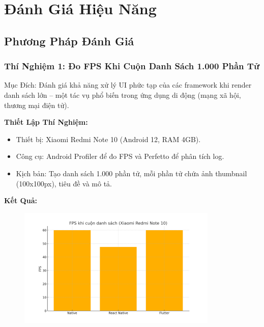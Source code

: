 \section{Đánh Giá Hiệu Năng}

\subsection{Phương Pháp Đánh Giá}
\renewcommand{\labelitemi}{--}    
\subsubsection{Thí Nghiệm 1: Đo FPS Khi Cuộn Danh Sách 1.000 Phần Tử}
\begin{flushleft}
  \hspace*{0.8cm}Mục Đích: Đánh giá khả năng xử lý UI phức tạp của các framework khi render danh sách lớn – một tác vụ phổ biến trong ứng dụng di động (mạng xã hội, thương mại điện tử).
\end{flushleft}

\begin{flushleft}
  \hspace*{0.8cm}\textbf{Thiết Lập Thí Nghiệm:}
  \setlength{\leftmargini}{1.5cm}
  \begin{itemize}
      \item Thiết bị: Xiaomi Redmi Note 10 (Android 12, RAM 4GB).
      \item Công cụ: Android Profiler để đo FPS và Perfetto để phân tích log.
      \item Kịch bản: Tạo danh sách 1.000 phần tử, mỗi phần tử chứa ảnh thumbnail (100x100px), tiêu đề và mô tả.
  \end{itemize}
\end{flushleft}

\vspace{0.5em}

\begin{flushleft}
  \hspace*{0.8cm}\textbf{Kết Quả:}
\end{flushleft}

\begin{figure}[H]
    \centering
    \includegraphics[width=0.85\textwidth]{images/performance_chart.png}
\end{figure}

